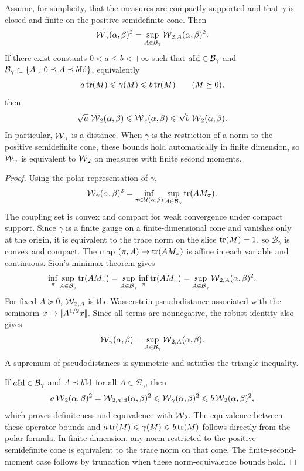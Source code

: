 \begin{prop}\label{prop-spectral-wasserstein-robust}
	Assume, for simplicity, that the measures are compactly supported and that $\gamma$ is closed and finite on the positive semidefinite cone. Then
	\[
		\operatorname{\mathcal{W}}_\gamma(\alpha,\beta)^2
		=
		\sup_{A\in\mathcal B_\gamma}
		\operatorname{\mathcal{W}}_{2,A}(\alpha,\beta)^2.
	\]
	If there exist constants $0<a\leq b<+\infty$ such that $a\mathrm{Id}\in\mathcal B_\gamma$ and $\mathcal B_\gamma\subset\left\{ A \;;\; 0\preceq A\preceq b\mathrm{Id} \right\}$, equivalently
	\[
		a\operatorname{tr}(M)\leqslant\gamma(M)\leqslant b\operatorname{tr}(M)
		\qquad (M\succeq0),
	\]
	then
	\[
		\sqrt a\,\operatorname{\mathcal{W}}_2(\alpha,\beta)
		\leqslant
		\operatorname{\mathcal{W}}_\gamma(\alpha,\beta)
		\leqslant
		\sqrt b\,\operatorname{\mathcal{W}}_2(\alpha,\beta).
	\]
	In particular, $\operatorname{\mathcal{W}}_\gamma$ is a distance. When $\gamma$ is the restriction of a norm to the positive semidefinite cone, these bounds hold automatically in finite dimension, so $\operatorname{\mathcal{W}}_\gamma$ is equivalent to $\operatorname{\mathcal{W}}_2$ on measures with finite second moments.
\end{prop}

\begin{proof}
	Using the polar representation of $\gamma$,
	\[
		\operatorname{\mathcal{W}}_\gamma(\alpha,\beta)^2
		=
		\inf_{\pi\in\mathcal{U}(\alpha,\beta)}
		\sup_{A\in\mathcal B_\gamma}\operatorname{tr}(AM_\pi).
	\]
	The coupling set is convex and compact for weak convergence under compact support. Since $\gamma$ is a finite gauge on a finite-dimensional cone and vanishes only at the origin, it is equivalent to the trace norm on the slice $\operatorname{tr}(M)=1$, so $\mathcal B_\gamma$ is convex and compact. The map $(\pi,A)\mapsto\operatorname{tr}(AM_\pi)$ is affine in each variable and continuous. Sion's minimax theorem gives
	\[
		\inf_\pi\sup_{A\in\mathcal B_\gamma}\operatorname{tr}(AM_\pi)
		=
		\sup_{A\in\mathcal B_\gamma}\inf_\pi\operatorname{tr}(AM_\pi)
		=
		\sup_{A\in\mathcal B_\gamma}\operatorname{\mathcal{W}}_{2,A}(\alpha,\beta)^2.
	\]
	For fixed $A\succeq0$, $\operatorname{\mathcal{W}}_{2,A}$ is the Wasserstein pseudodistance associated with the seminorm $x\mapsto|\!| A^{1/2}x |\!|$. Since all terms are nonnegative, the robust identity also gives
	\[
		\operatorname{\mathcal{W}}_\gamma(\alpha,\beta)
		=
		\sup_{A\in\mathcal B_\gamma}\operatorname{\mathcal{W}}_{2,A}(\alpha,\beta).
	\]
	A supremum of pseudodistances is symmetric and satisfies the triangle inequality.

	If $a\mathrm{Id}\in\mathcal B_\gamma$ and $A\preceq b\mathrm{Id}$ for all $A\in\mathcal B_\gamma$, then
	\[
		a\operatorname{\mathcal{W}}_2(\alpha,\beta)^2
		=
		\operatorname{\mathcal{W}}_{2,a\mathrm{Id}}(\alpha,\beta)^2
		\leqslant
		\operatorname{\mathcal{W}}_\gamma(\alpha,\beta)^2
		\leqslant
		b\operatorname{\mathcal{W}}_2(\alpha,\beta)^2,
	\]
	which proves definiteness and equivalence with $\operatorname{\mathcal{W}}_2$. The equivalence between these operator bounds and $a\operatorname{tr}(M)\leqslant\gamma(M)\leqslant b\operatorname{tr}(M)$ follows directly from the polar formula. In finite dimension, any norm restricted to the positive semidefinite cone is equivalent to the trace norm on that cone. The finite-second-moment case follows by truncation when these norm-equivalence bounds hold.
\end{proof}

